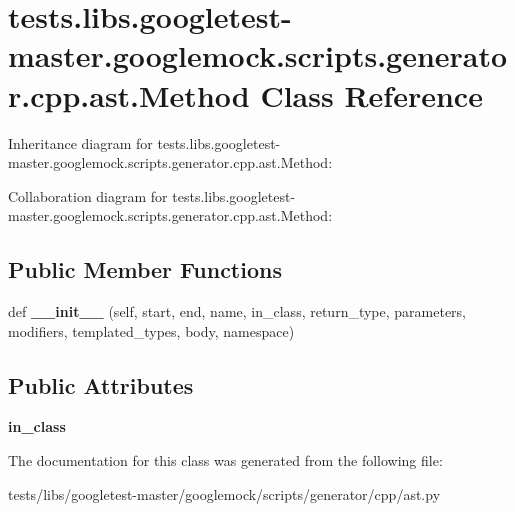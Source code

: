 \hypertarget{classtests_1_1libs_1_1googletest-master_1_1googlemock_1_1scripts_1_1generator_1_1cpp_1_1ast_1_1Method}{}\section{tests.\+libs.\+googletest-\/master.googlemock.\+scripts.\+generator.\+cpp.\+ast.\+Method Class Reference}
\label{classtests_1_1libs_1_1googletest-master_1_1googlemock_1_1scripts_1_1generator_1_1cpp_1_1ast_1_1Method}


Inheritance diagram for tests.\+libs.\+googletest-\/master.googlemock.\+scripts.\+generator.\+cpp.\+ast.\+Method\+:


Collaboration diagram for tests.\+libs.\+googletest-\/master.googlemock.\+scripts.\+generator.\+cpp.\+ast.\+Method\+:
\subsection*{Public Member Functions}
\begin{DoxyCompactItemize}
\item 
\mbox{\label{classtests_1_1libs_1_1googletest-master_1_1googlemock_1_1scripts_1_1generator_1_1cpp_1_1ast_1_1Method_a45558456b5161199778bef622d270d59}} 
def {\bfseries \+\_\+\+\_\+init\+\_\+\+\_\+} (self, start, end, name, in\+\_\+class, return\+\_\+type, parameters, modifiers, templated\+\_\+types, body, namespace)
\end{DoxyCompactItemize}
\subsection*{Public Attributes}
\begin{DoxyCompactItemize}
\item 
\mbox{\label{classtests_1_1libs_1_1googletest-master_1_1googlemock_1_1scripts_1_1generator_1_1cpp_1_1ast_1_1Method_a2d73ef8a1d0b005558c242c00a916811}} 
{\bfseries in\+\_\+class}
\end{DoxyCompactItemize}


The documentation for this class was generated from the following file\+:\begin{DoxyCompactItemize}
\item 
tests/libs/googletest-\/master/googlemock/scripts/generator/cpp/ast.\+py\end{DoxyCompactItemize}
